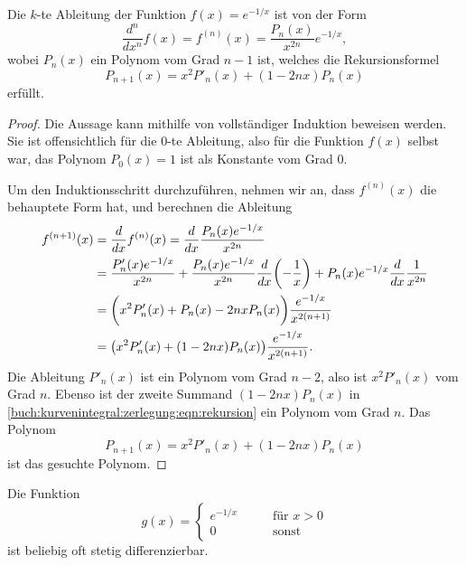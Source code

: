 \begin{satz}
Die $k$-te Ableitung der Funktion $f(x)=e^{-1/x}$ ist von der Form
\[
\frac{d^n}{dx^n}f(x)
=
f^{(n)}(x)
=
\frac{P_n(x)}{x^{2n}}e^{-1/x},
\]
wobei $P_n(x)$ ein Polynom vom Grad $n-1$ ist, welches die
Rekursionsformel
\[
P_{n+1}(x)
=
x^2P'_n(x) + (1-2nx)P_n(x)
\]
erfüllt.
\end{satz}

\begin{proof}
Die Aussage kann mithilfe von vollständiger Induktion beweisen
werden.
Sie ist offensichtlich für die $0$-te Ableitung, also für die Funktion
$f(x)$ selbst war, das Polynom $P_0(x)=1$ ist als Konstante vom Grad 0.

Um den Induktionsschritt durchzuführen, nehmen wir an, dass $f^{(n)}(x)$
die behauptete Form hat, und berechnen die Ableitung
\begin{align}
f^{(n+1)}(x)
&=
\frac{d}{dx}
f^{(n)}(x)
=
\frac{d}{dx}
\frac{P_n(x) e^{-1/x}}{x^{2n}}
\notag
\\
&=
\frac{P'_n(x)e^{-1/x}}{x^{2n}}
+
\frac{P_n(x)e^{-1/x}}{x^{2n}}\frac{d}{dx}\biggl(-\frac1x\biggr)
+
P_n(x)e^{-1/x}\frac{d}{dx}\frac{1}{x^{2n}}
\notag
\\
&=
\biggl(
x^2 P'_n(x)
+
P_n(x)
-
2nx P_n(x)
\biggr)\frac{e^{-1/x}}{x^{2(n+1)}}
\notag
\\
&=
\bigl(x^2P'_n(x)+(1-2nx)P_n(x)\bigr) \frac{e^{-1/x}}{x^{2(n+1)}}.
\label{buch:kurvenintegral:zerlegung:eqn:rekursion}
\end{align}
Die Ableitung $P'_n(x)$ ist ein Polynom vom Grad $n-2$, also ist
$x^2P'_n(x)$ vom Grad $n$.
Ebenso ist der zweite Summand $(1-2nx)P_n(x)$ in
\eqref{buch:kurvenintegral:zerlegung:eqn:rekursion}
ein Polynom vom Grad $n$.
Das Polynom
\[
P_{n+1}(x)
=
x^2P'_{n}(x)+(1-2nx)P_n(x)
\]
ist das gesuchte Polynom.
\end{proof}

\begin{satz}
\label{buch:kurvenintegral:zerlegung:satz:g}
Die Funktion
\[
g(x)
=
\begin{cases}
e^{-1/x}&\qquad\text{für $x>0$}\\
0&\qquad\text{sonst}
\end{cases}
\]
ist beliebig oft stetig differenzierbar.
\end{satz}

